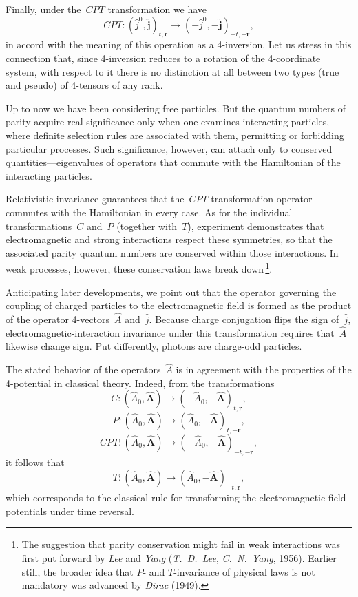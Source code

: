 Finally, under the~$CPT$ transformation we have
\begin{equation}
CPT:(\hat{j}^0, \hat{\mathbf{j}})_{t,\mathbf{r}} \to (-\hat{j}^0, -\hat{\mathbf{j}})_{-t,-\mathbf{r}},
\tag{13.16}
\end{equation}
in accord with the meaning of this operation as a 4-inversion. Let us stress in this connection that, since 4-inversion reduces to a rotation of the 4-coordinate system, with respect to it there is no distinction at all between two types (true and pseudo) of 4-tensors of any rank.

Up to now we have been considering free particles. But the quantum numbers of parity acquire real significance only when one examines interacting particles, where definite selection rules are associated with them, permitting or forbidding particular processes. Such significance, however, can attach only to conserved quantities---eigenvalues of operators that commute with the Hamiltonian of the interacting particles.

Relativistic invariance guarantees that the~$CPT$-transformation operator commutes with the Hamiltonian in every case. As for the individual transformations~$C$ and~$P$ (together with~$T$), experiment demonstrates that electromagnetic and strong interactions respect these symmetries, so that the associated parity quantum numbers are conserved within those interactions. In weak processes, however, these conservation laws break down\,\footnote{The suggestion that parity conservation might fail in weak interactions
was first put forward by \emph{Lee} and \emph{Yang} (\emph{T.~D.~Lee}, \emph{C.~N.~Yang}, 1956). Earlier still, the broader idea that $P$- and $T$-invariance of physical laws is not mandatory was advanced by \emph{Dirac} (1949).}.

Anticipating later developments, we point out that the operator governing the coupling of charged particles to the electromagnetic field is formed as the product of the operator 4-vectors~$\hat{A}$ and~$\hat{j}$. Because charge conjugation flips the sign of~$\hat{j}$, electromagnetic-interaction invariance under this transformation requires that~$\hat{A}$ likewise change sign. Put differently, photons are charge-odd particles.

The stated behavior of the operators~$\hat{A}$ is in agreement with the properties of the 4-potential in classical theory. Indeed, from the transformations
\[
C: (\hat{A}_0, \hat{\mathbf{A}}) \to (-\hat{A}_0, -\hat{\mathbf{A}})_{t,\mathbf{r}},
\]
\[
P: (\hat{A}_0, \hat{\mathbf{A}}) \to (\hat{A}_0, -\hat{\mathbf{A}})_{t,-\mathbf{r}},
\]
\[
CPT: (\hat{A}_0, \hat{\mathbf{A}}) \to (-\hat{A}_0, -\hat{\mathbf{A}})_{-t,-\mathbf{r}},
\]
it follows that
\[
T: (\hat{A}_0, \hat{\mathbf{A}}) \to (\hat{A}_0, -\hat{\mathbf{A}})_{-t,\mathbf{r}},
\]
which corresponds to the classical rule for transforming the electromagnetic-field potentials under time reversal.

